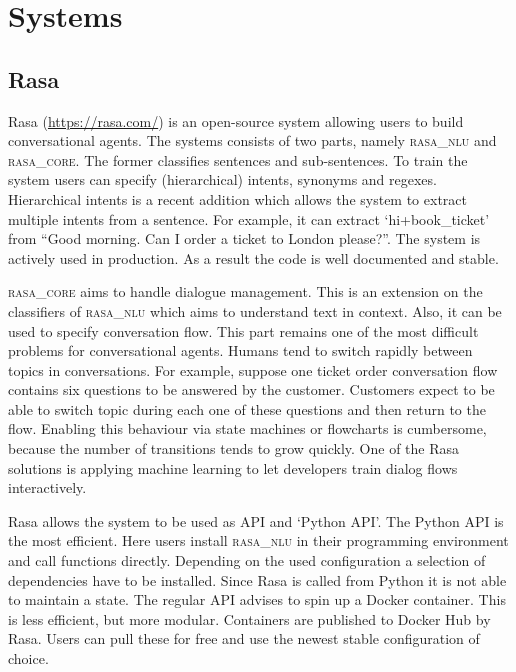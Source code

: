 \section{Systems}
\label{sec:systems}

\subsection{Rasa}
\label{subsec:rasa}
Rasa (\url{https://rasa.com/}) is an open-source system allowing users to build conversational agents.
The systems consists of two parts, namely \textsc{rasa\_nlu} and \textsc{rasa\_core}.
The former classifies sentences and sub-sentences.
To train the system users can specify (hierarchical) intents, synonyms and regexes.
Hierarchical intents is a recent addition which allows the system to extract multiple intents from a sentence.
For example, it can extract `hi+book\_ticket' from
``Good morning.
Can I order a ticket to London please?''.
The system is actively used in production.
As a result the code is well documented and stable.

\textsc{rasa\_core} aims to handle dialogue management.
This is an extension on the classifiers of \textsc{rasa\_nlu} which aims to understand text in context.
Also, it can be used to specify conversation flow.
This part remains one of the most difficult problems for conversational agents.
Humans tend to switch rapidly between topics in conversations.
For example, suppose one ticket order conversation flow contains six questions to be answered by the customer.
Customers expect to be able to switch topic during each one of these questions and then return to the flow.
Enabling this behaviour via state machines or flowcharts is cumbersome, because the number of transitions tends to grow quickly.
One of the Rasa solutions is applying machine learning to let developers train dialog flows interactively.

Rasa allows the system to be used as API and `Python API'.
The Python API is the most efficient.
Here users install \textsc{rasa\_nlu} in their programming environment and call functions directly.
Depending on the used configuration a selection of dependencies have to be installed.
Since Rasa is called from Python it is not able to maintain a state.
The regular API advises to spin up a Docker container.
This is less efficient, but more modular.
Containers are published to Docker Hub by Rasa.
Users can pull these for free and use the newest stable configuration of choice.

